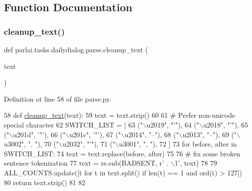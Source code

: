 \subsection{Function Documentation}
\mbox{\label{namespaceparlai_1_1tasks_1_1dailydialog_1_1parse_a9bee736957d0b4eb0a046855faa821dc}} 
\subsubsection{\texorpdfstring{cleanup\+\_\+text()}{cleanup\_text()}}
{\footnotesize\ttfamily def parlai.\+tasks.\+dailydialog.\+parse.\+cleanup\+\_\+text (\begin{DoxyParamCaption}\item[{}]{text }\end{DoxyParamCaption})}



Definition at line 58 of file parse.\+py.


\begin{DoxyCode}
58 \textcolor{keyword}{def }\hyperlink{namespaceparlai_1_1tasks_1_1dailydialog_1_1parse_a9bee736957d0b4eb0a046855faa821dc}{cleanup\_text}(text):
59     text = text.strip()
60 
61     \textcolor{comment}{# Prefer non-unicode special character}
62     SWITCH\_LIST = [
63         (\textcolor{stringliteral}{"\(\backslash\)u2019"}, \textcolor{stringliteral}{"'"}),
64         (\textcolor{stringliteral}{"\(\backslash\)u2018"}, \textcolor{stringliteral}{"'"}),
65         (\textcolor{stringliteral}{"\(\backslash\)u201d"}, \textcolor{stringliteral}{'"'}),
66         (\textcolor{stringliteral}{"\(\backslash\)u201c"}, \textcolor{stringliteral}{'"'}),
67         (\textcolor{stringliteral}{"\(\backslash\)u2014"}, \textcolor{stringliteral}{"--"}),
68         (\textcolor{stringliteral}{"\(\backslash\)u2013"}, \textcolor{stringliteral}{"--"}),
69         (\textcolor{stringliteral}{"\(\backslash\)u3002"}, \textcolor{stringliteral}{". "}),
70         (\textcolor{stringliteral}{"\(\backslash\)u2032"}, \textcolor{stringliteral}{"'"}),
71         (\textcolor{stringliteral}{"\(\backslash\)u3001"}, \textcolor{stringliteral}{", "}),
72     ]
73     \textcolor{keywordflow}{for} before, after \textcolor{keywordflow}{in} SWITCH\_LIST:
74         text = text.replace(before, after)
75 
76     \textcolor{comment}{# fix some broken sentence tokenization}
77     text = re.sub(BADSENT, \textcolor{stringliteral}{r' . \(\backslash\)1'}, text)
78 
79     ALL\_COUNTS.update([t \textcolor{keywordflow}{for} t \textcolor{keywordflow}{in} text.split() \textcolor{keywordflow}{if} len(t) == 1 \textcolor{keywordflow}{and} ord(t) > 127])
80     \textcolor{keywordflow}{return} text.strip()
81 
82 
\end{DoxyCode}


